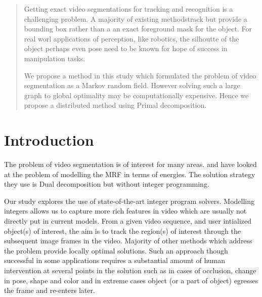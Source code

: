 \documentclass{article}
\begin{document}
 


\begin{abstract} 
Getting exact video segmentations for tracking and recognition is a challenging problem. 
A majority of existing methodstrack but provide a bounding box rather than a an exact foreground
mask for the object. For real worl applications of perception, like robotics, the silhoutte of the object
perhaps even pose need to be known for hope of success in manipulation tasks.

We propose a method in this study which formulated the problem of video segmentation
as a Markov random field. However solving such a large graph to global optimality may 
be computationally expensive. Hence we propose a distributed method using Primal 
decomposition. 

\end{abstract} 


\section{Introduction}

The problem of video segmentation is of interest for many areas. 
\cite{Komodakis2007a, Komodakis2011a} and \cite{Tsai2010}
have looked at the problem of modelling the MRF in terms of energies. 
The solution strategy they use is Dual decomposition but without integer programming.

Our study explores the use of state-of-the-art integer program solvers. Modelling integers
allows us to capture more rich features in video which are usually not directly put in current 
models. 
From a given video sequence, and user intialized object(s)
of interest, the aim is to track the region(s) of interest through
the subsequent image frames in the video. Majority of other
methods which address the problem provide locally optimal
solutions. Such an approach though successful in some applications
requires a substantial amount of human intervention
at several points in the solution such as in cases of occlusion,
change in pose, shape and color and in extreme cases object
(or a part of object) egresses the frame and re-enters later.
\end{document}
